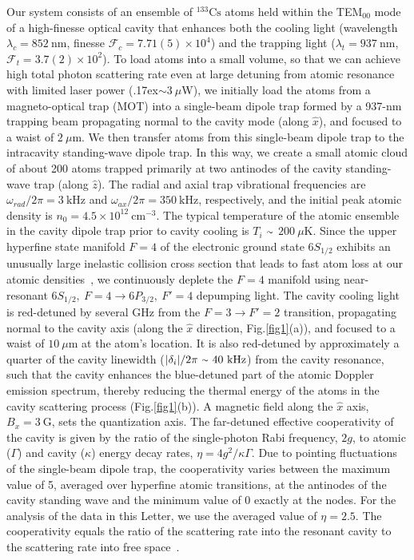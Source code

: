 \documentclass[aps,prl,superscriptaddress,onecloumn,nobibnotes]{revtex4-1}
\begin{document}
Our system consists of an ensemble of $\mathrm{^{133}Cs}$ atoms held within the TEM$_{00}$ mode of a high-finesse optical cavity that enhances both the cooling light (wavelength $\lambda_c=852 ~\mathrm{nm}$, finesse $\mathcal{F}_c=7.71(5)\times 10^4$) and the trapping light ($\lambda_t=937 ~\mathrm{nm}$, $\mathcal{F}_t=3.7(2) \times 10^2$). To load atoms into a small volume, so that we can achieve high total photon scattering rate even at large detuning from atomic resonance with limited laser power ({\raise.17ex\hbox{$\scriptstyle\mathtt{\sim}$}}$3~\mu$W), we initially load the atoms from a magneto-optical trap (MOT) into a single-beam dipole trap formed by a 937-nm trapping beam propagating normal to the cavity mode (along $\hat{x}$), and focused to a waist of $2 ~\mu$m. We then transfer atoms from this single-beam dipole trap to the intracavity standing-wave dipole trap. In this way, we create a small atomic cloud of about 200 atoms trapped primarily at two antinodes of the cavity standing-wave trap (along $\hat{z}$). The radial and axial trap vibrational frequencies are $\omega_{rad}/2\pi=3~\mathrm{kHz}$ and $\omega_{ax}/2\pi=350 ~\mathrm{kHz}$, respectively, and the initial peak atomic density is $n_0=4.5\times10^{12}~\mathrm{cm}^{-3}$. The typical temperature of the atomic ensemble in the cavity dipole trap prior to cavity cooling is $T_{i}$ ${\raise.17ex\hbox{$\scriptstyle\mathtt{\sim}$}}$ $200 ~\mu\mathrm{K}$. Since the upper hyperfine state manifold $F=4$ of the electronic ground state $6S_{1/2}$ exhibits an unusually large inelastic collision cross section that leads to fast atom loss at our atomic densities~\cite{Chin:PRL2000}, we continuously deplete the $F=4$ manifold using near-resonant $6S_{1/2},~F=4\to 6P_{3/2},~F'=4$ depumping light. The cavity cooling light is red-detuned by several GHz from the $F=3\to F'=2$ transition, propagating normal to the cavity axis (along the $\hat{x}$ direction, Fig.\ref{fig1}(a)), and focused to a waist of $10 ~\mu\mathrm{m}$ at the atom's location. It is also red-detuned by approximately a quarter of the cavity linewidth ($\vert \delta_i \vert/2\pi ~{\raise.17ex\hbox{$\scriptstyle\mathtt{\sim}$}} ~40 ~\mathrm{kHz}$) from the cavity resonance, such that the cavity enhances the blue-detuned part of the atomic Doppler emission spectrum, thereby reducing the thermal energy of the atoms in the cavity scattering process (Fig.\ref{fig1}(b)). 
 A magnetic field along the $\hat{x}$ axis, $B_x=3 ~\mathrm{G}$, sets the quantization
 axis. The far-detuned effective cooperativity of the cavity is given
 by the ratio of the single-photon Rabi frequency, $2g$, to atomic ($\Gamma$) and cavity ($\kappa$) energy decay rates, $\eta=4g^2/\kappa\Gamma$. Due to pointing fluctuations of the single-beam dipole trap, the cooperativity varies between the maximum value of 5, averaged over hyperfine atomic transitions, at the antinodes of the cavity standing wave and the minimum value of 0 exactly at the nodes. For the analysis of the data in this Letter, we use the averaged value of $\eta=2.5$. The cooperativity equals the ratio of the scattering rate into the resonant cavity to the scattering rate into free space~\cite{Haruka:AAMOP2011}. 
\end{document}

